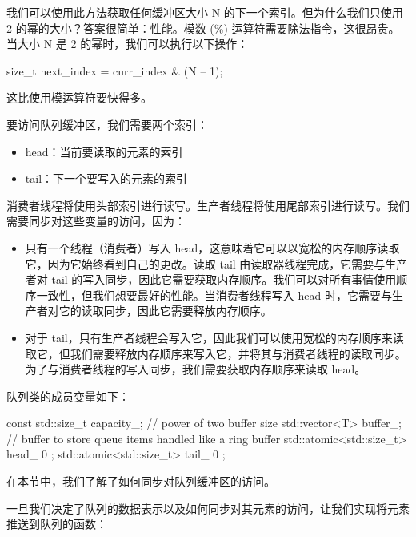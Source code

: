 我们可以使用此方法获取任何缓冲区大小 N 的下一个索引。但为什么我们只使用 2 的幂的大小？答案很简单：性能。模数 (\%) 运算符需要除法指令，这很昂贵。当大小 N 是 2 的幂时，我们可以执行以下操作：

\begin{cpp}
size_t next_index = curr_index & (N – 1);
\end{cpp}

这比使用模运算符要快得多。


要访问队列缓冲区，我们需要两个索引：

\begin{itemize}
\item
head：当前要读取的元素的索引

\item
tail：下一个要写入的元素的索引
\end{itemize}

消费者线程将使用头部索引进行读写。生产者线程将使用尾部索引进行读写。我们需要同步对这些变量的访问，因为：

\begin{itemize}
\item
只有一个线程（消费者）写入 head，这意味着它可以以宽松的内存顺序读取它，因为它始终看到自己的更改。读取 tail 由读取器线程完成，它需要与生产者对 tail 的写入同步，因此它需要获取内存顺序。我们可以对所有事情使用顺序一致性，但我们想要最好的性能。当消费者线程写入 head 时，它需要与生产者对它的读取同步，因此它需要释放内存顺序。

\item
对于 tail，只有生产者线程会写入它，因此我们可以使用宽松的内存顺序来读取它，但我们需要释放内存顺序来写入它，并将其与消费者线程的读取同步。为了与消费者线程的写入同步，我们需要获取内存顺序来读取 head。
\end{itemize}

队列类的成员变量如下：

\begin{cpp}
const std::size_t capacity_; // power of two buffer size
std::vector<T> buffer_; // buffer to store queue items handled like a
ring buffer
std::atomic<std::size_t> head_{ 0 };
std::atomic<std::size_t> tail_{ 0 };
\end{cpp}

在本节中，我们了解了如何同步对队列缓冲区的访问。


一旦我们决定了队列的数据表示以及如何同步对其元素的访问，让我们实现将元素推送到队列的函数：

